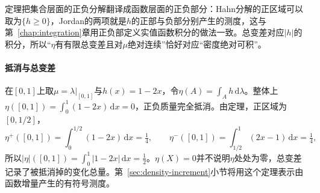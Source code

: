 定理把集合层面的正负分解翻译成函数层面的正负部分：Hahn分解的正区域可以取为$\{h\ge0\}$，Jordan的两项就是$h$的正部与负部分别产生的测度，这与第~\ref{chap:integration}章用正负部定义实值函数积分的做法一致。总变差对应$|h|$的积分，所以“$\eta$有有限总变差且对$\mu$绝对连续”恰好对应“密度绝对可积”。

\paragraph{抵消与总变差}
在$[0,1]$上取$\mu=\lambda|_{[0,1]}$与$h(x)=1-2x$，令$\eta(A)=\int_Ah\,\mathrm d\lambda$。整体上$\eta([0,1])=\int_0^1(1-2x)\,\mathrm dx=0$，正负质量完全抵消。由定理，正区域为$[0,1/2]$，
\[
 \eta^+([0,1])=\int_0^{1/2}(1-2x)\,\mathrm dx=\tfrac14,\qquad \eta^-([0,1])=\int_{1/2}^1(2x-1)\,\mathrm dx=\tfrac14,
\]
所以$|\eta|([0,1])=\int_0^1|1-2x|\,\mathrm dx=\tfrac12$。$\eta(X)=0$并不说明$\eta$处处为零，总变差记录了被抵消掉的变化总量。第~\ref{sec:density-increment}小节将用这个定理表示由函数增量产生的有符号测度。
